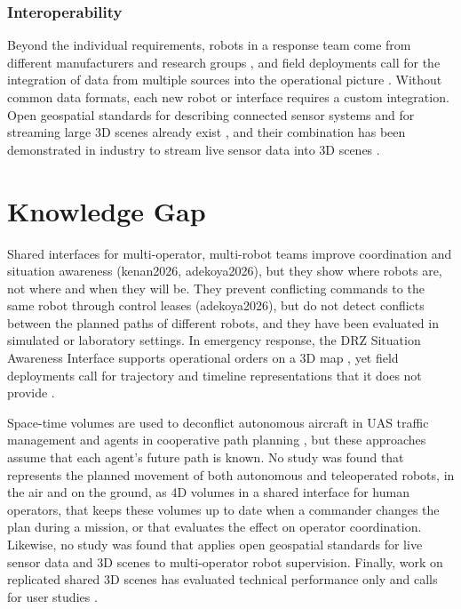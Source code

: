 \documentclass{article}
\begin{document}
\subsubsection{Interoperability}
Beyond the individual requirements, robots in a response team come from
different manufacturers and research groups \cite{kruijff2021, surmann2024},
and field deployments call for the integration of data from multiple sources
into the operational picture \cite{surmann2024}.
Without common data formats, each new robot or interface requires a custom
integration.
Open geospatial standards for describing connected sensor systems and for
streaming large 3D scenes already exist \cite{ogc23001, ogc3dtiles}, and
their combination has been demonstrated in industry to stream live sensor
data into 3D scenes \cite{georobotix2026}.


\section{Knowledge Gap}
Shared interfaces for multi-operator, multi-robot teams improve coordination and situation awareness (kenan2026, adekoya2026), but they show where robots are, not where and when they will be.
They prevent conflicting commands to the same robot through control leases (adekoya2026), but do not detect conflicts between the planned paths of different robots, and they have been evaluated in simulated or laboratory settings.
In emergency response, the DRZ Situation Awareness Interface supports operational orders on a 3D map \cite{kruijff2021}, yet field deployments call for trajectory and timeline representations that it does not provide \cite{surmann2024}.

Space-time volumes are used to deconflict autonomous aircraft in UAS traffic management \cite{astmf3548} and agents in cooperative path planning \cite{silver2005}, but these approaches assume that each agent's future path is known.
No study was found that represents the planned movement of both autonomous and teleoperated robots, in the air and on the ground, as 4D volumes in a shared interface for human operators, that keeps these volumes up to date when a commander changes the plan during a mission, or that evaluates the effect on operator coordination.
Likewise, no study was found that applies open geospatial standards for live sensor data and 3D scenes \cite{ogc23001, ogc3dtiles} to multi-operator robot supervision.
Finally, work on replicated shared 3D scenes has evaluated technical performance only and calls for user studies \cite{dantas2025}.
\end{document}
